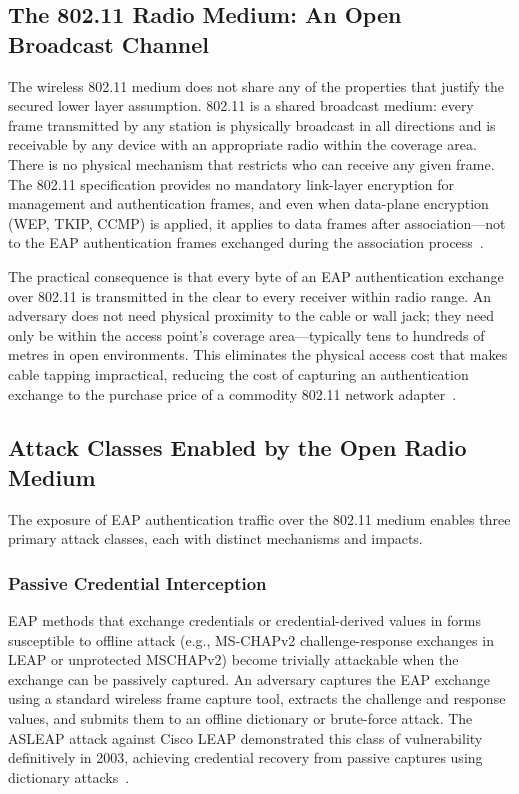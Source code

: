 \documentclass[journal]{IEEEtran}
\begin{document}
\subsection{The 802.11 Radio Medium: An Open Broadcast Channel}

The wireless 802.11 medium does not share any of the properties that justify the
secured lower layer assumption. 802.11 is a shared broadcast medium: every frame
transmitted by any station is physically broadcast in all directions and is
receivable by any device with an appropriate radio within the coverage area. There
is no physical mechanism that restricts who can receive any given frame. The
802.11 specification provides no mandatory link-layer encryption for management
and authentication frames, and even when data-plane encryption (WEP, TKIP, CCMP)
is applied, it applies to data frames after association---not to the EAP
authentication frames exchanged during the association process~\cite{ieee80211i}.

The practical consequence is that every byte of an EAP authentication exchange
over 802.11 is transmitted in the clear to every receiver within radio range. An
adversary does not need physical proximity to the cable or wall jack; they need only
be within the access point's coverage area---typically tens to hundreds of metres
in open environments. This eliminates the physical access cost that makes cable
tapping impractical, reducing the cost of capturing an authentication exchange to
the purchase price of a commodity 802.11 network adapter~\cite{potter2005}.

\subsection{Attack Classes Enabled by the Open Radio Medium}

The exposure of EAP authentication traffic over the 802.11 medium enables three
primary attack classes, each with distinct mechanisms and impacts.

\subsubsection{Passive Credential Interception}

EAP methods that exchange credentials or credential-derived values in forms
susceptible to offline attack (e.g., MS-CHAPv2 challenge-response exchanges in
LEAP or unprotected MSCHAPv2) become trivially attackable when the exchange can be
passively captured. An adversary captures the EAP exchange using a standard wireless
frame capture tool, extracts the challenge and response values, and submits them to
an offline dictionary or brute-force attack. The ASLEAP attack against Cisco LEAP
demonstrated this class of vulnerability definitively in 2003, achieving credential
recovery from passive captures using dictionary attacks~\cite{wright2003asleap}.
\end{document}
